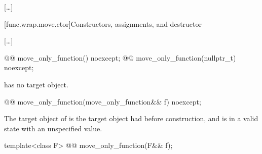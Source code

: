 [\ldots]

[func.wrap.move.ctor]{Constructors, assignments, and destructor}

[\ldots]

%
\begin{itemdecl}
@@ move_only_function() noexcept;
@@ move_only_function(nullptr_t) noexcept;
\end{itemdecl}

\begin{itemdescr}
\pnum
\ensures
{} has no target object.
\end{itemdescr}

%
\begin{itemdecl}
@@ move_only_function(move_only_function&& f) noexcept;
\end{itemdecl}

\begin{itemdescr}
\pnum
\ensures
The target object of  is the target object  had before construction, and  is in a valid state with an unspecified value.
\end{itemdescr}

%
\begin{itemdecl}
template<class F>
  @@ move_only_function(F&& f);
\end{itemdecl}

